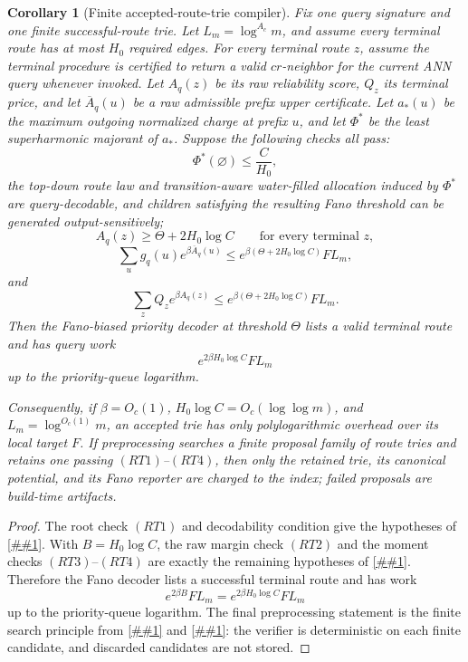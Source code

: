 \documentclass[10pt]{article}
\newcommand{\cref}[1]{\ref{##1}}
\newtheorem{corollary}[theorem]{Corollary}
\theoremstyle{definition}
\begin{document}
\begin{corollary}[Finite accepted-route-trie compiler]
   \label{cor:finite-accepted-route-trie-compiler}
   Fix one query signature and one finite successful-route trie.  Let
   \(L_m=\log^{A_c}m\), and assume every terminal route has at most \(H_0\)
   required edges.  For every terminal route \(z\), assume the terminal
   procedure is certified to return a valid \(cr\)-neighbor for the current ANN
   query whenever invoked.  Let \(A_q(z)\) be its raw reliability score, \(Q_z\)
   its terminal price, and let \(\overline A_q(u)\) be a raw admissible prefix
   upper certificate.  Let \(a_*(u)\) be the maximum outgoing normalized charge
   at prefix \(u\), and let \(\Phi^*\) be the least superharmonic majorant of
   \(a_*\).  Suppose the following checks all pass:
   \[
      \Phi^*(\varnothing)\le \frac{C}{H_0},
      \tag{RT1}
   \]
   the top-down route law and transition-aware water-filled allocation induced
   by \(\Phi^*\) are query-decodable, and children satisfying the resulting
   Fano threshold can be generated output-sensitively;
   \[
      A_q(z)\ge\Theta+2H_0\log C
      \qquad\text{for every terminal }z,
      \tag{RT2}
   \]
   \[
      \sum_u g_q(u)e^{\beta\overline A_q(u)}
      \le
      e^{\beta(\Theta+2H_0\log C)}F L_m,
      \tag{RT3}
   \]
   and
   \[
      \sum_z Q_z e^{\beta A_q(z)}
      \le
      e^{\beta(\Theta+2H_0\log C)}F L_m.
      \tag{RT4}
   \]
   Then the Fano-biased priority decoder at threshold \(\Theta\) lists a valid
   terminal route and has query work
   \[
      e^{2\beta H_0\log C}F L_m
   \]
   up to the priority-queue logarithm.

   Consequently, if \(\beta=O_c(1)\), \(H_0\log C=O_c(\log\log m)\), and
   \(L_m=\log^{O_c(1)}m\), an accepted trie has only polylogarithmic overhead
   over its local target \(F\).  If preprocessing searches a finite proposal
   family of route tries and retains one passing \((RT1)\)--\((RT4)\), then
   only the retained trie, its canonical potential, and its Fano reporter are
   charged to the index; failed proposals are build-time artifacts.
\end{corollary}

\begin{proof}
   The root check \((RT1)\) and decodability condition give the hypotheses of
   \cref{cor:offline-superharmonic-route-verifier}.  With
   \(B=H_0\log C\), the raw margin check \((RT2)\) and the moment checks
   \((RT3)\)--\((RT4)\) are exactly the remaining hypotheses of
   \cref{cor:existential-antichain-fano}.  Therefore the Fano decoder lists a
   successful terminal route and has work
   \[
      e^{2\beta B}F L_m
      =
      e^{2\beta H_0\log C}F L_m
   \]
   up to the priority-queue logarithm.  The final preprocessing statement is
   the finite search principle from \cref{lem:finite-pool-optimizer} and
   \cref{cor:offline-pareto-compression}: the verifier is deterministic on
   each finite candidate, and discarded candidates are not stored.
\end{proof}
\end{document}
